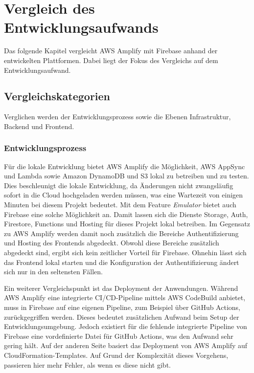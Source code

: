 \chapter{Vergleich des Entwicklungsaufwands}

Das folgende Kapitel vergleicht \ac{AWS} Amplify mit Firebase anhand der entwickelten Plattformen. Dabei liegt der Fokus des Vergleichs auf dem Entwicklungsaufwand.

\section{Vergleichskategorien}

Verglichen werden der Entwicklungsprozess sowie die Ebenen Infrastruktur, Backend und Frontend.

\subsection{Entwicklungsprozess}

Für die lokale Entwicklung bietet \ac{AWS} Amplify die Möglichkeit, \ac{AWS} AppSync und Lambda sowie Amazon DynamoDB und S3 lokal zu betreiben und zu testen. Dies beschleunigt die lokale Entwicklung, da Änderungen nicht zwangsläufig sofort in die Cloud hochgeladen werden müssen, was eine Wartezeit von einigen Minuten bei diesem Projekt bedeutet. Mit dem Feature \textit{Emulator} bietet auch Firebase eine solche Möglichkeit an. Damit lassen sich die Dienste Storage, Auth, Firestore, Functions und Hosting für dieses Projekt lokal betreiben. Im Gegensatz zu \ac{AWS} Amplify werden damit noch zusätzlich die Bereiche Authentifizierung und Hosting des Frontends abgedeckt. Obwohl diese Bereiche zusätzlich abgedeckt sind, ergibt sich kein zeitlicher Vorteil für Firebase. Ohnehin lässt sich das Frontend lokal starten und die Konfiguration der Authentifizierung ändert sich nur in den seltensten Fällen.

Ein weiterer Vergleichspunkt ist das Deployment der Anwendungen. Während \ac{AWS} Amplify eine integrierte CI/CD-Pipeline mittels \ac{AWS} CodeBuild anbietet, muss in Firebase auf eine eigenen Pipeline, zum Beispiel über GitHub Actions, zurückgegriffen werden. Dieses bedeutet zusätzlichen Aufwand beim Setup der Entwicklungsumgebung. Jedoch existiert für die fehlende integrierte Pipeline von Firebase eine vordefinierte Datei für GitHub Actions, was den Aufwand sehr gering hält. Auf der anderen Seite basiert das Deployment von \ac{AWS} Amplify auf CloudFormation-Templates. Auf Grund der Komplexität dieses Vorgehens, passieren hier mehr Fehler, als wenn es diese nicht gibt.

